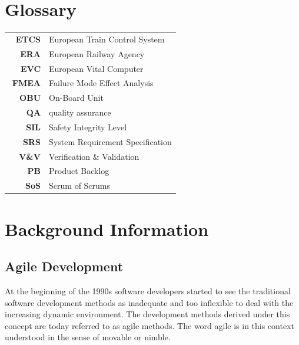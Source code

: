 
\section{Glossary}
\label{sec:glossary}



\begin{tabular}{rl}
\ %
\textbf{ETCS} & European Train Control System \\ 
\textbf{ERA} & European Railway Agency \\ 
\textbf{EVC} & European Vital Computer \\
\textbf{FMEA} & Failure Mode Effect Analysis \\ 
\textbf{OBU} & On-Board Unit \\ 
\textbf{QA} & quality assurance \\
\textbf{SIL} & Safety Integrity Level \\ 
\textbf{SRS} & System Requirement Specification \\ 
\textbf{V\&V} & Verification \& Validation \\ 
\textbf{PB} & Product Backlog \\ 
\textbf{SoS} & Scrum of Scrums \\ 
\end{tabular} 




\section{Background Information}
\label{sec:Background}


\subsection{Agile Development}

At the beginning of the 1990s software developers started to see the traditional software development methods as inadequate and too inflexible to deal with the increasing dynamic environment. The development methods derived under this concept are today referred to as agile methods. The word agile is in this context understood in the sense of movable or nimble. 

